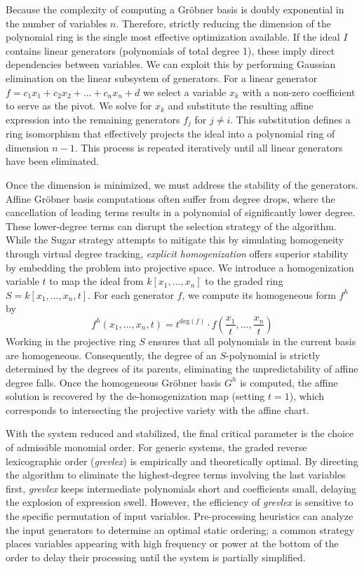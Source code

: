 Because the complexity of computing a Gröbner basis is doubly exponential in the number of variables $n$. Therefore, strictly reducing the dimension of the polynomial ring is the single most effective optimization available. If the ideal $I$ contains linear generators (polynomials of total degree 1), these imply direct dependencies between variables. We can exploit this by performing Gaussian elimination on the linear subsystem of generators. For a linear generator $f = c_1 x_1 + c_2 x_2 + \dots + c_n x_n + d$ we select a variable $x_k$ with a non-zero coefficient to serve as the pivot. We solve for $x_k$ and substitute the resulting affine expression into the remaining generators $f_j$ for $j \neq i$. This substitution defines a ring isomorphism that effectively projects the ideal into a polynomial ring of dimension $n-1$. This process is repeated iteratively until all linear generators have been eliminated.

Once the dimension is minimized, we must address the stability of the generators. Affine Gröbner basis computations often suffer from degree drops, where the cancellation of leading terms results in a polynomial of significantly lower degree. These lower-degree terms can disrupt the selection strategy of the algorithm. While the Sugar strategy attempts to mitigate this by simulating homogeneity through virtual degree tracking, \textit{explicit homogenization} offers superior stability by embedding the problem into projective space. We introduce a homogenization variable $t$ to map the ideal from $k[x_1, \dots, x_n]$ to the graded ring $S = k[x_1, \dots, x_n, t]$. For each generator $f$, we compute its homogeneous form $f^h$ by
$$
f^h(x_1, \dots, x_n, t) = t^{\text{deg}(f)} \cdot f\left(\frac{x_1}{t}, \dots, \frac{x_n}{t}\right)
$$
Working in the projective ring $S$ ensures that all polynomials in the current basis are homogeneous. Consequently, the degree of an $S$-polynomial is strictly determined by the degrees of its parents, eliminating the unpredictability of affine degree falls. Once the homogeneous Gröbner basis $G^h$ is computed, the affine solution is recovered by the de-homogenization map (setting $t=1$), which corresponds to intersecting the projective variety with the affine chart.

With the system reduced and stabilized, the final critical parameter is the choice of admissible monomial order. For generic systems, the graded reverse lexicographic order (\textit{grevlex}) is empirically and theoretically optimal. By directing the algorithm to eliminate the highest-degree terms involving the last variables first, \textit{grevlex} keeps intermediate polynomials short and coefficients small, delaying the explosion of expression swell. However, the efficiency of \textit{grevlex} is sensitive to the specific permutation of input variables. Pre-processing heuristics can analyze the input generators to determine an optimal static ordering; a common strategy places variables appearing with high frequency or power at the bottom of the order to delay their processing until the system is partially simplified.

